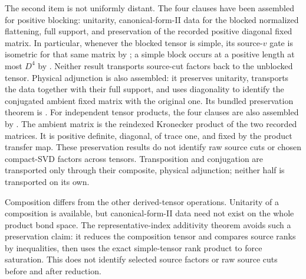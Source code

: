 \documentclass{article}
\begin{document}
The second item is not uniformly distant. The four clauses have been assembled
for positive blocking: unitarity, canonical-form-II data for the blocked
normalized flattening, full support, and preservation of the recorded
positive diagonal fixed matrix. In particular, whenever the blocked tensor is
simple, its source-$v$ gate is isometric for that same matrix by
; a
simple block occurs at a positive length at most $D^4$ by
.
Neither result transports source-cut factors back to the unblocked tensor.
Physical adjunction is also assembled: it preserves unitarity, transports the
data together with their full support, and uses diagonality to identify the
conjugated ambient fixed matrix with the original one. Its bundled
preservation theorem is
. For
independent tensor products, the four clauses are also assembled by
. The ambient matrix is
the reindexed Kronecker product of the two recorded matrices. It is positive
definite, diagonal, of trace one, and fixed by the product transfer map.
These preservation results do not identify raw source cuts or chosen
compact-SVD factors across tensors. Transposition and conjugation are
transported only through their composite, physical adjunction; neither half
is transported on its own.

Composition differs from the other derived-tensor operations. Unitarity of a
composition is available, but canonical-form-II data need not exist on the
whole product bond space. The representative-index additivity theorem avoids
such a preservation claim: it reduces the composition tensor and compares
source ranks by inequalities, then uses the exact simple-tensor rank product
to force saturation. This does not identify selected source factors or raw
source cuts before and after reduction.
\end{document}
